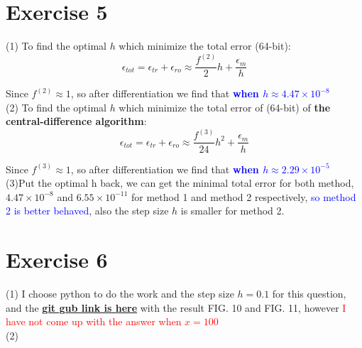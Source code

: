 \documentclass[aps,12pt,prd,nofootinbib,bibnotes, amsmath,amssymb,showpacs,superscriptaddress,floatfix]{revtex4-2}
\begin{document}
\section{Exercise 5}
(1)
To find the optimal $h$ which minimize the total error (64-bit):
\begin{equation}
\epsilon_{tot}=\epsilon_{tr}+\epsilon_{ro} \approx \frac{f^{(2)}}{2} h + \frac{\epsilon_{m}}{h}
\end{equation}

Since $f^{(2)} \approx 1$, so after differentiation we find that \textcolor{blue}{\bf{when $h \approx 4.47 \times 10^{-8}$}} \\

(2)
To find the optimal $h$ which minimize the total error of (64-bit) of {\bf{the central-difference algorithm}}:
\begin{equation}
\epsilon_{tot}=\epsilon_{tr}+\epsilon_{ro} \approx \frac{f^{(3)}}{24} h^2 + \frac{\epsilon_{m}}{h}
\end{equation}

Since $f^{(3)} \approx 1$, so after differentiation we find that \textcolor{blue}{\bf{when $h \approx 2.29 \times 10^{-5}$}} \\

(3)Put the optimal h back, we can get the minimal total error for both method, $4.47 \times 10^{-8}$ and $6.55 \times 10^{-11}$ for method 1 and method 2 respectively, {\textcolor{blue}{so method 2 is better behaved}}, also the step size $h$ is smaller for method 2.

\section{Exercise 6}
(1) I choose python to do the work and the step size $h=0.1$ for this question, and the \href{https://github.com/kuo1235/Computational-Astrophysics-2022/blob/main/astr660/Homework/HW2/Exercise6.py
}{\bf{git gub link is here}} with the result FIG. 10 and FIG. 11, however \textcolor{red}{I have not come up with the answer when $x=100$}\\ 


(2)




\end{document}
